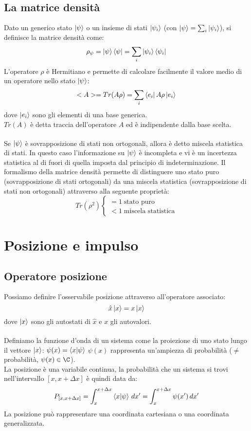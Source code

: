\documentclass{article}
\begin{document}
\subsection{La matrice densità}
Dato un generico stato $\ket{\psi}$ o un insieme di stati $\ket{\psi_i}$ (con $\ket{\psi}=\sum_i\ket{\psi_i}$), si definisce la matrice densità come:
$$ \rho_\psi=\ket{\psi}\bra{\psi}=\sum_i\ket{\psi_i}\bra{\psi_i} $$
L'operatore $\rho$ è Hermitiano e permette di calcolare facilmente il valore medio di un operatore nello stato $\ket{\psi}$:
$$<A>=Tr(A\rho)=\sum_i\bra{e_i}A\rho\ket{e_i} $$
dove $\ket{e_i}$ sono gli elementi di una base generica.\\
$Tr(A)$ è detta traccia dell'operatore $A$ ed è indipendente dalla base scelta.\\\\
Se $\ket{\psi}$ è sovrapposizione di stati non ortogonali, allora è detto miscela statistica di stati. In questo caso l'informazione su $\ket{\psi}$ è incompleta e vi è un incertezza statistica al di fuori di quella imposta dal principio di indeterminazione. Il formalismo della matrice densità permette di distinguere uno stato puro (sovrapposizione di stati ortogonali) da una miscela statistica (sovrapposizione di stati non ortogonali) attraverso alla seguente proprietà:
$$ Tr(\rho^2) \begin{cases}
    =1\;\text{stato puro}\\
    <1\;\text{miscela statistica}
\end{cases} $$

\newpage
\section{Posizione e impulso}

\subsection{Operatore posizione}
Possiamo definire l'osservabile posizione attraverso all'operatore associato:
$$\hat{x}\ket{x}=x\ket{x}$$
dove $\ket{x}$ sono gli autostati di $\hat{x}$ e $x$ gli autovalori.\\\\
Definiamo la funzione d'onda di un sistema come la proiezione di uno stato lungo il vettore $\ket{x}$:
$\psi(x)=\bra{x}\ket{\psi}$
$\psi(x)$ rappresenta un'ampiezza di probabilità ($\neq$ probabilità, $\psi(x)\in\C$).\\
La posizione è una variabile continua, la probabilità che un sistema si trovi nell'intervallo $[x,x+\Delta x]$ è quindi data da:
$$ P_{[x,x+\Delta x]}=\int_x^{x+\Delta x}\bra{x}\ket{\psi}\,dx'=\int_x^{x+\Delta x}\psi(x')\,dx'$$
La posizione può rappresentare una coordinata cartesiana o una coordinata generalizzata.
\end{document}
